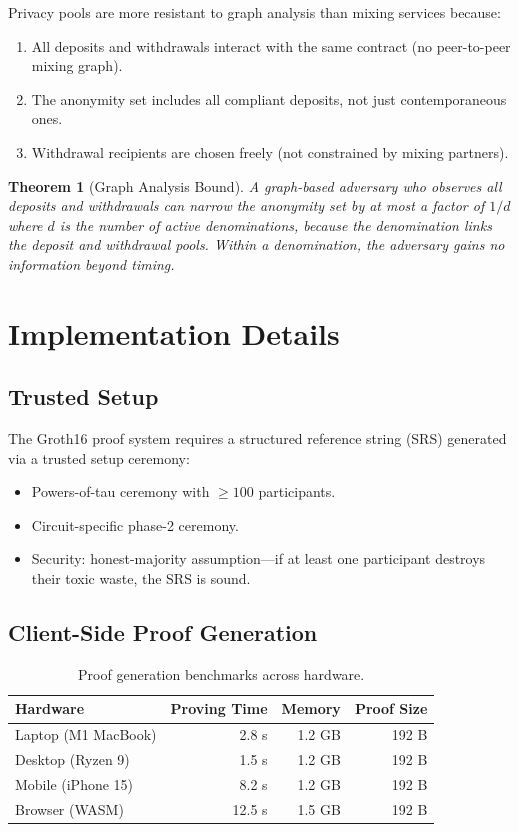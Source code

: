 \documentclass[11pt,a4paper]{article}
\newtheorem{theorem}{Theorem}
\begin{document}
Privacy pools are more resistant to graph analysis than mixing services because:

\begin{enumerate}
    \item All deposits and withdrawals interact with the same contract (no peer-to-peer mixing graph).
    \item The anonymity set includes all compliant deposits, not just contemporaneous ones.
    \item Withdrawal recipients are chosen freely (not constrained by mixing partners).
\end{enumerate}

\begin{theorem}[Graph Analysis Bound]
A graph-based adversary who observes all deposits and withdrawals can narrow the anonymity set by at most a factor of $1/d$ where $d$ is the number of active denominations, because the denomination links the deposit and withdrawal pools. Within a denomination, the adversary gains no information beyond timing.
\end{theorem}

\section{Implementation Details}\label{sec:implementation}

\subsection{Trusted Setup}

The Groth16 proof system requires a structured reference string (SRS) generated via a trusted setup ceremony:

\begin{itemize}
    \item Powers-of-tau ceremony with $\geq 100$ participants.
    \item Circuit-specific phase-2 ceremony.
    \item Security: honest-majority assumption---if at least one participant destroys their toxic waste, the SRS is sound.
\end{itemize}

\subsection{Client-Side Proof Generation}

\begin{table}[H]
\centering
\caption{Proof generation benchmarks across hardware.}
\label{tab:proving}
\begin{tabular}{lrrr}
\toprule
\textbf{Hardware} & \textbf{Proving Time} & \textbf{Memory} & \textbf{Proof Size} \\
\midrule
Laptop (M1 MacBook) & 2.8 s & 1.2 GB & 192 B \\
Desktop (Ryzen 9) & 1.5 s & 1.2 GB & 192 B \\
Mobile (iPhone 15) & 8.2 s & 1.2 GB & 192 B \\
Browser (WASM) & 12.5 s & 1.5 GB & 192 B \\
\bottomrule
\end{tabular}
\end{table}
\end{document}

